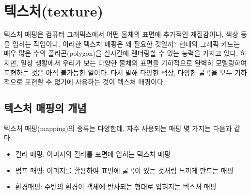 \renewcommand\chapterillustration{OGL_texture/chapterImage}



\chapter{텍스처(texture)}



텍스처 매핑은 컴퓨터 그래픽스에서 어떤 물체의 표면에 추가적인 재질감이나, 색상 등을 입히는 작업이다. 이러한 텍스처 매핑은 왜 필요한 것일까?
현대의 그래픽 카드는 매우 많은 수의 폴리곤(polygon)을 실시간에 렌더링할 수 있는 능력을 가지고 있다. 하지만, 일상 생활에서 우리가 보는 다양한 물체의 표면을 기하적으로 완벽히 모델링하여 표현하는 것은 아직 불가능한 일이다. 다시 말해 다양한 색상, 다양한 굴곡을 모두 기하적으로 표현할 수 없기에 사용하는 것이 텍스처 매핑이다.

\section{텍스처 매핑의 개념}

텍스처 매핑(mapping)의 종류는 다양한데, 자주 사용되는 매핑 몇 가지는 다음과 같다.

\begin{itemize}
\item 컬러 매핑: 이미지의 컬러를 표면에 입히는 텍스처 매핑
\item 범프 매핑: 이미지를 활용하여 표면에 굴곡이 있는 것처럼 느끼게 만드는 매핑
\item 환경매핑: 주변의 환경이 객체에 반사되는 형태로 입혀지는 텍스처 매핑
\end{itemize}


